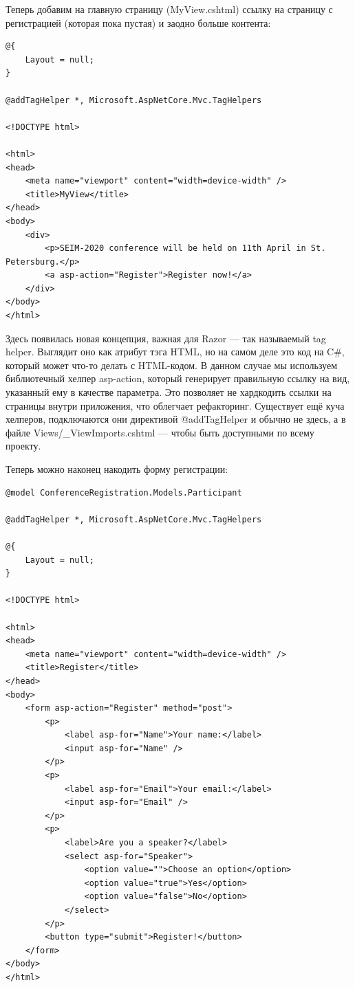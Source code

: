 \documentclass[a5paper]{article}
\begin{document}
Теперь добавим на главную страницу (MyView.cshtml) ссылку на страницу с регистрацией (которая пока пустая) и заодно больше контента:

\begin{verbatim}
@{
    Layout = null;
}

@addTagHelper *, Microsoft.AspNetCore.Mvc.TagHelpers

<!DOCTYPE html>

<html>
<head>
    <meta name="viewport" content="width=device-width" />
    <title>MyView</title>
</head>
<body>
    <div>
        <p>SEIM-2020 conference will be held on 11th April in St. Petersburg.</p>
        <a asp-action="Register">Register now!</a>
    </div>
</body>
</html>
\end{verbatim}

Здесь появилась новая концепция, важная для Razor --- так называемый tag helper. Выглядит оно как атрибут тэга HTML, но на самом деле это код на C\#, который может что-то делать с HTML-кодом. В данном случае мы используем библиотечный хелпер asp-action, который
генерирует правильную ссылку на вид, указанный ему в качестве параметра. Это позволяет не хардкодить ссылки на страницы внутри приложения, что облегчает рефакторинг. Существует ещё куча хелперов, подключаются они директивой @addTagHelper и обычно не здесь, а в файле
Views/\_ViewImports.cshtml --- чтобы быть доступными по всему проекту.

Теперь можно наконец накодить форму регистрации:

\begin{verbatim}
@model ConferenceRegistration.Models.Participant

@addTagHelper *, Microsoft.AspNetCore.Mvc.TagHelpers

@{
    Layout = null;
}

<!DOCTYPE html>

<html>
<head>
    <meta name="viewport" content="width=device-width" />
    <title>Register</title>
</head>
<body>
    <form asp-action="Register" method="post">
        <p>
            <label asp-for="Name">Your name:</label>
            <input asp-for="Name" />
        </p>
        <p>
            <label asp-for="Email">Your email:</label>
            <input asp-for="Email" />
        </p>
        <p>
            <label>Are you a speaker?</label>
            <select asp-for="Speaker">
                <option value="">Choose an option</option>
                <option value="true">Yes</option>
                <option value="false">No</option>
            </select>
        </p>
        <button type="submit">Register!</button>
    </form>
</body>
</html>
\end{verbatim}
\end{document}
